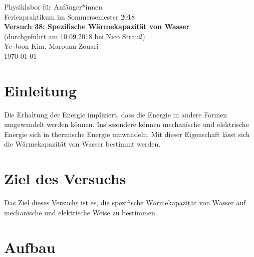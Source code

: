 \documentclass[11pt,a4paper]{article} %
\begin{document}
	
	
	{
		\centering 
		\large 
		Physiklabor für Anfänger*innen \\
		Ferienpraktikum im Sommersemester 2018 \\[4mm]
		\textbf{\LARGE 
			Versuch 38: Spezifische Wärmekapazität von Wasser
		} \\[3mm]
		(durchgeführt am 10.09.2018 bei Nico Strauß) \\
		Ye Joon Kim, Marouan Zouari\\
		\today \\[10mm]
	}
\section{Einleitung}
Die Erhaltung der Energie impliziert, dass die Energie in andere Formen umgewandelt werden können. Insbesondere können mechanische und elektrische Energie sich in thermische Energie umwandeln. Mit dieser Eigenschaft lässt sich die Wärmekapazität von Wasser bestimmt werden. 



\section{Ziel des Versuchs}
Das Ziel dieses Versuchs ist es, die spezifische Wärmekapazität von Wasser auf mechanische und elektrische Weise zu bestimmen.  
\section{Aufbau}
\end{document}
